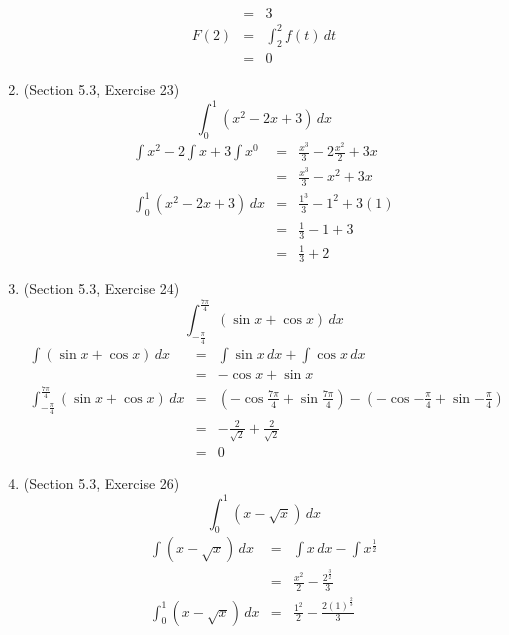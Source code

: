 \documentclass{article}
\begin{document}
\begin{enumerate}
\begin{eqnarray}
                 &=& 3 \\
            F(2) &=& \int_2^2{f(t)\,dt} \\
                 &=& 0
        \end{eqnarray}
    \item (Section 5.3, Exercise 23)
        $$\int_0^1{\left(x^2 - 2x + 3\right)\,dx}$$
        \begin{eqnarray}
            \int{x^2} - 2\int{x} + 3\int{x^0} &=& \frac{x^3}{3} - 2\frac{x^2}{2} + 3x \\
                                              &=& \frac{x^3}{3} - x^2 + 3x \\
            \int_0^1{\left(x^2 - 2x + 3\right)\,dx} &=& \frac{1^3}{3} - 1^2 + 3(1) \\
                                                    &=& \frac{1}{3} - 1 + 3 \\
                                                    &=& \frac{1}{3} + 2
        \end{eqnarray}
    \item (Section 5.3, Exercise 24)
        $$\int_{-\frac{\pi}{4}}^{\frac{7\pi}{4}}{\left(\sin{x} + \cos{x}\right)\,dx}$$
        \begin{eqnarray}
            \int{\left(\sin{x} + \cos{x}\right)\,dx} &=& \int{\sin{x}\,dx} + \int{\cos{x}\,dx} \\
                                                     &=& -\cos{x} + \sin{x} \\
            \int_{-\frac{\pi}{4}}^{\frac{7\pi}{4}}{\left(\sin{x} + \cos{x}\right)\,dx} &=& \left(-\cos{\frac{7\pi}{4}} + \sin{\frac{7\pi}{4}}\right) - \left(-\cos{-\frac{\pi}{4}} + \sin{-\frac{\pi}{4}}\right) \\
                                                                                       &=& -\frac{2}{\sqrt{2}} + \frac{2}{\sqrt{2}} \\
                                                                                       &=& 0
        \end{eqnarray}
    \item (Section 5.3, Exercise 26)
        $$\int_0^1{\left(x - \sqrt{x}\right)\,dx}$$
        \begin{eqnarray}
            \int{\left(x - \sqrt{x}\right)\,dx} &=& \int{x\,dx} - \int{x^{\frac{1}{2}}} \\
                                                &=& \frac{x^2}{2} - \frac{2^{\frac{3}{2}}}{3} \\
            \int_0^1{\left(x - \sqrt{x}\right)\,dx} &=& \frac{1^2}{2} - \frac{2\left(1\right)^{\frac{2}{3}}}{3} \\

\end{eqnarray}
\end{enumerate}
\end{document}

